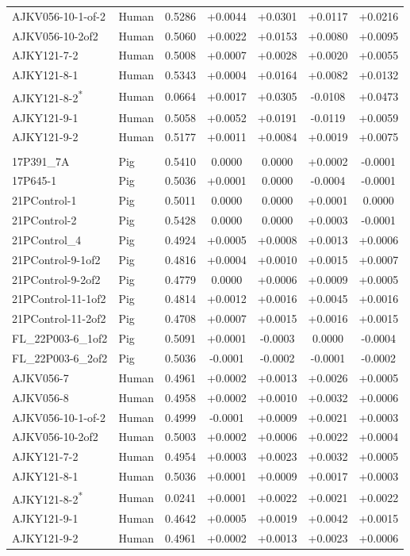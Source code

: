 \begin{longtable}{@{}ll S[table-format=1.4] *{4}{S[table-format=+1.4, retain-explicit-plus]}@{}}
AJKV056-10-1-of-2 & Human & 0.5286 & +0.0044 & +0.0301 & +0.0117 & +0.0216 \\
AJKV056-10-2of2 & Human & 0.5060 & +0.0022 & +0.0153 & +0.0080 & +0.0095 \\
AJKY121-7-2 & Human & 0.5008 & +0.0007 & +0.0028 & +0.0020 & +0.0055 \\
AJKY121-8-1 & Human & 0.5343 & +0.0004 & +0.0164 & +0.0082 & +0.0132 \\
AJKY121-8-2\textsuperscript{*} & Human & 0.0664 & +0.0017 & +0.0305 & -0.0108 & +0.0473 \\
AJKY121-9-1 & Human & 0.5058 & +0.0052 & +0.0191 & -0.0119 & +0.0059 \\
AJKY121-9-2 & Human & 0.5177 & +0.0011 & +0.0084 & +0.0019 & +0.0075 \\
\addlinespace
{} \\
17P391\_7A & Pig & 0.5410 & 0.0000 & 0.0000 & +0.0002 & -0.0001 \\
17P645-1 & Pig & 0.5036 & +0.0001 & 0.0000 & -0.0004 & -0.0001 \\
21PControl-1 & Pig & 0.5011 & 0.0000 & 0.0000 & +0.0001 & 0.0000 \\
21PControl-2 & Pig & 0.5428 & 0.0000 & 0.0000 & +0.0003 & -0.0001 \\
21PControl\_4 & Pig & 0.4924 & +0.0005 & +0.0008 & +0.0013 & +0.0006 \\
21PControl-9-1of2 & Pig & 0.4816 & +0.0004 & +0.0010 & +0.0015 & +0.0007 \\
21PControl-9-2of2 & Pig & 0.4779 & 0.0000 & +0.0006 & +0.0009 & +0.0005 \\
21PControl-11-1of2 & Pig & 0.4814 & +0.0012 & +0.0016 & +0.0045 & +0.0016 \\
21PControl-11-2of2 & Pig & 0.4708 & +0.0007 & +0.0015 & +0.0016 & +0.0015 \\
FL\_22P003-6\_1of2 & Pig & 0.5091 & +0.0001 & -0.0003 & 0.0000 & -0.0004 \\
FL\_22P003-6\_2of2 & Pig & 0.5036 & -0.0001 & -0.0002 & -0.0001 & -0.0002 \\
AJKV056-7 & Human & 0.4961 & +0.0002 & +0.0013 & +0.0026 & +0.0005 \\
AJKV056-8 & Human & 0.4958 & +0.0002 & +0.0010 & +0.0032 & +0.0006 \\
AJKV056-10-1-of-2 & Human & 0.4999 & -0.0001 & +0.0009 & +0.0021 & +0.0003 \\
AJKV056-10-2of2 & Human & 0.5003 & +0.0002 & +0.0006 & +0.0022 & +0.0004 \\
AJKY121-7-2 & Human & 0.4954 & +0.0003 & +0.0023 & +0.0032 & +0.0005 \\
AJKY121-8-1 & Human & 0.5036 & +0.0001 & +0.0009 & +0.0017 & +0.0003 \\
AJKY121-8-2\textsuperscript{*} & Human & 0.0241 & +0.0001 & +0.0022 & +0.0021 & +0.0022 \\
AJKY121-9-1 & Human & 0.4642 & +0.0005 & +0.0019 & +0.0042 & +0.0015 \\
AJKY121-9-2 & Human & 0.4961 & +0.0002 & +0.0013 & +0.0023 & +0.0006 \\
\end{longtable}
\endgroup

